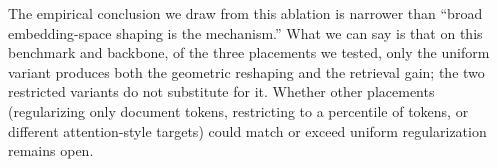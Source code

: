 The empirical conclusion we draw from this ablation is narrower than ``broad embedding-space shaping is the mechanism.'' What we can say is that on this benchmark and backbone, of the three placements we tested, only the uniform variant produces both the geometric reshaping and the retrieval gain; the two restricted variants do not substitute for it. Whether other placements (regularizing only document tokens, restricting to a percentile of tokens, or different attention-style targets) could match or exceed uniform regularization remains open.
